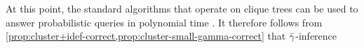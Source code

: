 At this point, the standard algorithms that operate on
clique trees
can be used to answer probabilistic queries in polynomial time \parencite[\S 10.3.3]{koller2009probabilistic}.
%
%
%
It therefore
follows from \cref{prop:cluster+idef-correct,prop:cluster-small-gamma-correct}
that
${\bar\gamma}$-inference
